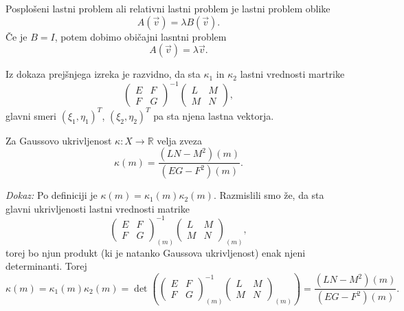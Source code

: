 \begin{definicija}
\label{def_posploseni_lastni_problem}
 Posplošeni lastni problem ali relativni lastni problem je lastni problem oblike \begin{equation*}
   A(\vec{v}) = \lambda B(\vec{v}).
 \end{equation*}  
  Če je $B = I$, potem dobimo običajni lasntni problem \begin{equation*}
    A(\vec{v}) = \lambda \vec{v}.
  \end{equation*}  
\end{definicija}

Iz dokaza prejšnjega izreka je razvidno, da sta $\kappa_1$ in $\kappa_2$ lastni vrednosti martrike \begin{equation*}
  \begin{pmatrix}
  E & F \\
  F & G
  \end{pmatrix}^{-1}\begin{pmatrix}
  L & M \\
  M & N
  \end{pmatrix},
\end{equation*}  
  glavni smeri $(\xi_1, \eta_1)^{T}$, $(\xi_2, \eta_2)^{T}$ pa sta njena lastna vektorja.


\begin{izrek}
\label{izr_izrazava_gaussove_ukrivljenosti}
Za Gaussovo ukrivljenost $\kappa: X \to  \mathbb{R}$ velja zveza \begin{equation*}
\kappa(m) = \frac{(LN - M^2)(m)}{(EG - F^2)(m)}. 
\end{equation*}  
\end{izrek}

\noident
{\em Dokaz:\/}
Po definiciji je $\kappa(m) = \kappa_1(m) \kappa_2(m)$. Razmislili smo že, da sta glavni ukrivljenosti
lastni vrednosti matrike \begin{equation*}
  \begin{pmatrix}
    E & F \\
    F & G
    \end{pmatrix}_{(m)}^{-1}\begin{pmatrix}
    L & M \\
    M & N
    \end{pmatrix}_{(m)},
\end{equation*}  
  torej bo njun produkt (ki je natanko Gaussova ukrivljenost) enak njeni determinanti. Torej \begin{equation*}
    \kappa(m) = \kappa_1(m) \kappa_2(m) = \det \left(  \begin{pmatrix}
      E & F \\
      F & G
      \end{pmatrix}_{(m)}^{-1}\begin{pmatrix}
      L & M \\
      M & N
      \end{pmatrix}_{(m)} \right) = \frac{(LN - M^2)(m)}{(EG - F^2)(m)}.
  \end{equation*}  
    
